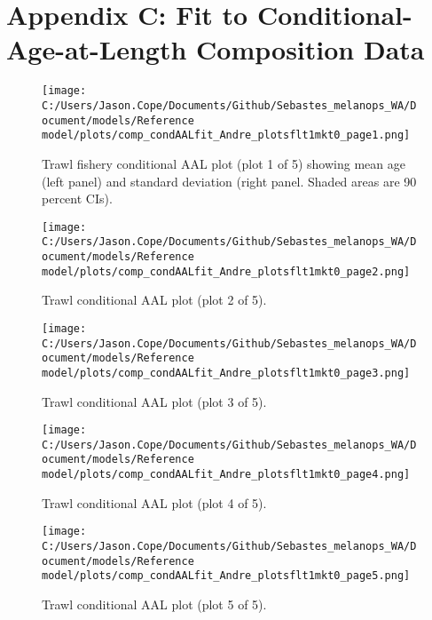 \documentclass[11pt,
  english,
  letterpaper,
]{article}
\begin{document}
\clearpage

\hypertarget{app-c}{%
\section{Appendix C: Fit to Conditional-Age-at-Length Composition Data}\label{app-c}}

\begin{figure}
\centering
\texttt{[image: C:/Users/Jason.Cope/Documents/Github/Sebastes\_melanops\_WA/Document/models/Reference model/plots/comp\_condAALfit\_Andre\_plotsflt1mkt0\_page1.png]}
\caption{Trawl fishery conditional AAL plot (plot 1 of 5) showing mean age (left panel) and standard deviation (right panel. Shaded areas are 90 percent CIs).\label{fig:comp_condAALfit_Andre_plotsflt1mkt0_page1}}
\end{figure}

\begin{figure}
\centering
\texttt{[image: C:/Users/Jason.Cope/Documents/Github/Sebastes\_melanops\_WA/Document/models/Reference model/plots/comp\_condAALfit\_Andre\_plotsflt1mkt0\_page2.png]}
\caption{Trawl conditional AAL plot (plot 2 of 5).\label{fig:comp_condAALfit_Andre_plotsflt1mkt0_page2}}
\end{figure}

\begin{figure}
\centering
\texttt{[image: C:/Users/Jason.Cope/Documents/Github/Sebastes\_melanops\_WA/Document/models/Reference model/plots/comp\_condAALfit\_Andre\_plotsflt1mkt0\_page3.png]}
\caption{Trawl conditional AAL plot (plot 3 of 5).\label{fig:comp_condAALfit_Andre_plotsflt1mkt0_page3}}
\end{figure}

\begin{figure}
\centering
\texttt{[image: C:/Users/Jason.Cope/Documents/Github/Sebastes\_melanops\_WA/Document/models/Reference model/plots/comp\_condAALfit\_Andre\_plotsflt1mkt0\_page4.png]}
\caption{Trawl conditional AAL plot (plot 4 of 5).\label{fig:comp_condAALfit_Andre_plotsflt1mkt0_page4}}
\end{figure}

\begin{figure}
\centering
\texttt{[image: C:/Users/Jason.Cope/Documents/Github/Sebastes\_melanops\_WA/Document/models/Reference model/plots/comp\_condAALfit\_Andre\_plotsflt1mkt0\_page5.png]}
\caption{Trawl conditional AAL plot (plot 5 of 5).\label{fig:comp_condAALfit_Andre_plotsflt1mkt0_page5}}
\end{figure}
\end{document}
